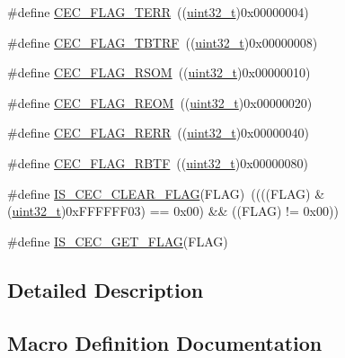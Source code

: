 \begin{DoxyCompactItemize}
\#define \hyperlink{group___c_e_c__flags__definition_ga7edc608ca7b4ea74dd4d795fa3214c11}{C\+E\+C\+\_\+\+F\+L\+A\+G\+\_\+\+T\+E\+RR}~((\hyperlink{_p_e___types_8h_a33594304e786b158f3fb30289278f5af}{uint32\+\_\+t})0x00000004)
\item 
\#define \hyperlink{group___c_e_c__flags__definition_gaeb02634fdd06f4ea0990e2cf23cf200e}{C\+E\+C\+\_\+\+F\+L\+A\+G\+\_\+\+T\+B\+T\+RF}~((\hyperlink{_p_e___types_8h_a33594304e786b158f3fb30289278f5af}{uint32\+\_\+t})0x00000008)
\item 
\#define \hyperlink{group___c_e_c__flags__definition_ga4e352d4f48e3b197edf150860703d2bf}{C\+E\+C\+\_\+\+F\+L\+A\+G\+\_\+\+R\+S\+OM}~((\hyperlink{_p_e___types_8h_a33594304e786b158f3fb30289278f5af}{uint32\+\_\+t})0x00000010)
\item 
\#define \hyperlink{group___c_e_c__flags__definition_gaffeaec4eafbf1efbd88139b9bb0654a7}{C\+E\+C\+\_\+\+F\+L\+A\+G\+\_\+\+R\+E\+OM}~((\hyperlink{_p_e___types_8h_a33594304e786b158f3fb30289278f5af}{uint32\+\_\+t})0x00000020)
\item 
\#define \hyperlink{group___c_e_c__flags__definition_gac2376c2b958536ab414574f60cb5d75a}{C\+E\+C\+\_\+\+F\+L\+A\+G\+\_\+\+R\+E\+RR}~((\hyperlink{_p_e___types_8h_a33594304e786b158f3fb30289278f5af}{uint32\+\_\+t})0x00000040)
\item 
\#define \hyperlink{group___c_e_c__flags__definition_gae73c6ec73ab8ad57b18d3bd416baf2d3}{C\+E\+C\+\_\+\+F\+L\+A\+G\+\_\+\+R\+B\+TF}~((\hyperlink{_p_e___types_8h_a33594304e786b158f3fb30289278f5af}{uint32\+\_\+t})0x00000080)
\item 
\#define \hyperlink{group___c_e_c__flags__definition_ga418911667f82a12dd097f7fac7ad4e89}{I\+S\+\_\+\+C\+E\+C\+\_\+\+C\+L\+E\+A\+R\+\_\+\+F\+L\+AG}(F\+L\+AG)~((((F\+L\+AG) \& (\hyperlink{_p_e___types_8h_a33594304e786b158f3fb30289278f5af}{uint32\+\_\+t})0x\+F\+F\+F\+F\+F\+F03) == 0x00) \&\& ((\+F\+L\+A\+G) != 0x00))
\item 
\#define \hyperlink{group___c_e_c__flags__definition_ga929b30d90f6807e9f72976596b0b850b}{I\+S\+\_\+\+C\+E\+C\+\_\+\+G\+E\+T\+\_\+\+F\+L\+AG}(F\+L\+AG)
\end{DoxyCompactItemize}


\subsection{Detailed Description}


\subsection{Macro Definition Documentation}
